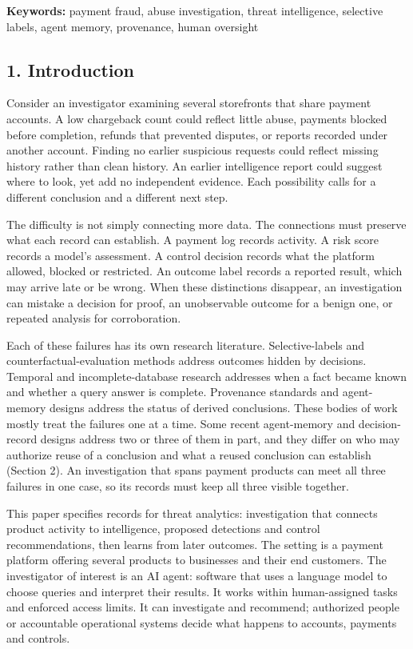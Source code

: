 \documentclass[
  11pt,
]{article}
\begin{document}
\textbf{Keywords:} payment fraud, abuse investigation, threat
intelligence, selective labels, agent memory, provenance, human
oversight

\FloatBarrier

\hypertarget{introduction}{%
\subsection{1. Introduction}\label{introduction}}

\suppressfloats[t]

Consider an investigator examining several storefronts that share
payment accounts. A low chargeback count could reflect little abuse,
payments blocked before completion, refunds that prevented disputes, or
reports recorded under another account. Finding no earlier suspicious
requests could reflect missing history rather than clean history. An
earlier intelligence report could suggest where to look, yet add no
independent evidence. Each possibility calls for a different conclusion
and a different next step.

The difficulty is not simply connecting more data. The connections must
preserve what each record can establish. A payment log records activity.
A risk score records a model's assessment. A control decision records
what the platform allowed, blocked or restricted. An outcome label
records a reported result, which may arrive late or be wrong. When these
distinctions disappear, an investigation can mistake a decision for
proof, an unobservable outcome for a benign one, or repeated analysis
for corroboration.

Each of these failures has its own research literature. Selective-labels
and counterfactual-evaluation methods address outcomes hidden by
decisions. Temporal and incomplete-database research addresses when a
fact became known and whether a query answer is complete. Provenance
standards and agent-memory designs address the status of derived
conclusions. These bodies of work mostly treat the failures one at a
time. Some recent agent-memory and decision-record designs address two
or three of them in part, and they differ on who may authorize reuse of
a conclusion and what a reused conclusion can establish (Section 2). An
investigation that spans payment products can meet all three failures in
one case, so its records must keep all three visible together.

This paper specifies records for threat analytics: investigation that
connects product activity to intelligence, proposed detections and
control recommendations, then learns from later outcomes. The setting is
a payment platform offering several products to businesses and their end
customers. The investigator of interest is an AI agent: software that
uses a language model to choose queries and interpret their results. It
works within human-assigned tasks and enforced access limits. It can
investigate and recommend; authorized people or accountable operational
systems decide what happens to accounts, payments and controls.
\end{document}
